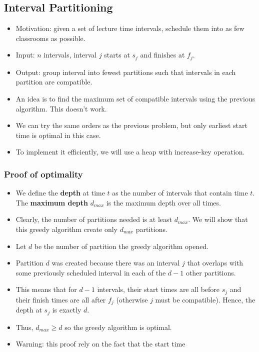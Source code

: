 \documentclass[a4paper]{article}
\begin{document}
\subsection{Interval Partitioning}
\begin{itemize}
    \item Motivation: given a set of lecture time intervals, schedule them into as few classrooms as possible.
    \item Input: $n$ intervals, interval $j$ starts at $s_j$ and finishes at $f_j$.
    \item Output: group interval into fewest partitions such that intervals in each partition are compatible.
    \item An idea is to find the maximum set of compatible intervals using the previous algorithm. This doesn't work.
    \item We can try the same orders as the previous problem, but only earliest start time is optimal in this case.
    \item To implement it efficiently, we will use a heap with increase-key operation.
\end{itemize}
\subsubsection{Proof of optimality}
\begin{itemize}
    \item We define the \textbf{depth} at time $t$ as the number of intervals that contain time $t$. The \textbf{maximum depth} $d_{max}$ is the maximum depth over all times.
    \item Clearly, the number of partitions needed is at least $d_{max}$. We will show that this greedy algorithm create only $d_{max}$ partitions.
    \item Let $d$ be the number of partition the greedy algorithm opened.
    \item Partition $d$ was created because there was an interval $j$ that overlaps with some previously scheduled interval in each of the $d-1$ other partitions.
    \item This means that for $d-1$ intervals, their start times are all before $s_j$ and their finish times are all after $f_j$ (otherwise $j$ must be compatible). Hence, the depth at $s_j$ is exactly $d$.
    \item Thus, $d_{max}\geq d$ so the greedy algorithm is optimal.
    \item Warning: this proof rely on the fact that the start time
\end{itemize}
\end{document}
